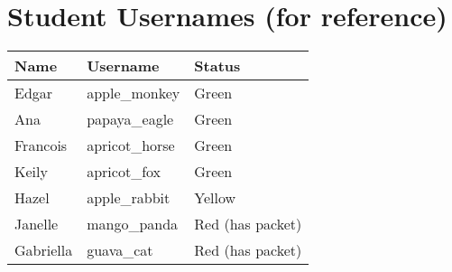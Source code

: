 \documentclass[11pt]{article}
\begin{document}
\vspace{0.15in}

\section*{Student Usernames (for reference)}

\begin{center}
\begin{tabular}{|l|l|l|}
\hline
\textbf{Name} & \textbf{Username} & \textbf{Status} \\
\hline
Edgar & apple\_monkey & Green \\
Ana & papaya\_eagle & Green \\
Francois & apricot\_horse & Green \\
Keily & apricot\_fox & Green \\
Hazel & apple\_rabbit & Yellow \\
Janelle & mango\_panda & Red (has packet) \\
Gabriella & guava\_cat & Red (has packet) \\
\hline
\end{tabular}
\end{center}
\end{document}
